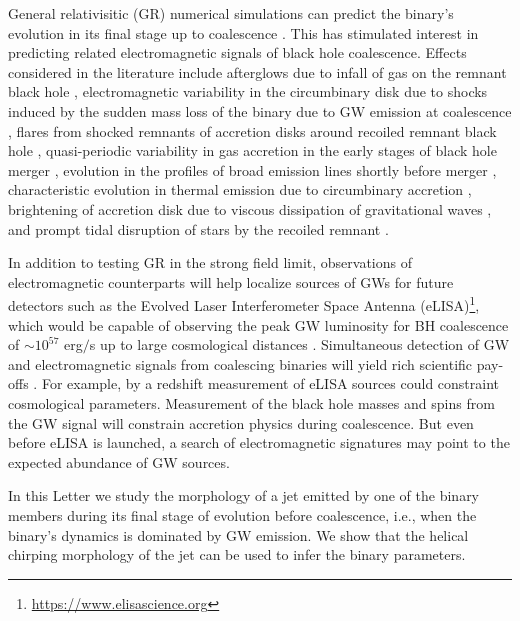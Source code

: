 \documentclass[iop]{emulateapj}
\begin{document}
General relativisitic (GR) numerical simulations can predict the
binary's evolution in its final stage up to coalescence
\citep{2005PhRvL..95l1101P, 2006PhRvL..96k1102B, 2006PhRvL..96k1101C}.
This has stimulated interest in predicting related electromagnetic
signals of black hole coalescence.  Effects considered in the
literature include afterglows due to infall of gas on the remnant
black hole \citep{2005ApJ...622L..93M}, electromagnetic variability in
the circumbinary disk due to shocks induced by the sudden mass loss of
the binary due to GW emission at coalescence
\citep{2007APS..APR.S1010B}, flares from shocked remnants of accretion
disks around recoiled remnant black hole \citep{2007PhRvL..99d1103L,
  2008ApJ...682..758S, 2009CQGra..26i4032H}, quasi-periodic
variability in gas accretion in the early stages of black hole merger
\citep{2008ApJ...672...83M, 2009CQGra..26i4032H, 2012MNRAS.427.2680K},
evolution in the profiles of broad emission lines shortly before
merger \citep{2013MNRAS.432.1468M}, characteristic evolution in
thermal emission due to circumbinary accretion
\citep{2015MNRAS.446L..36F}, brightening of accretion disk due to
viscous dissipation of gravitational waves
\citep{2008PhRvL.101d1101K}, and prompt tidal disruption of stars by
the recoiled remnant \citep{2011MNRAS.412...75S}.

In addition to testing GR in the strong field limit, observations of
electromagnetic counterparts will help localize sources of GWs for
future detectors such as the Evolved Laser Interferometer Space
Antenna (eLISA)\footnote{\url{https://www.elisascience.org}}, which would be
capable of observing the peak GW luminosity for BH coalescence of
$\sim 10^{57}$ erg$/$s up to large cosmological distances
\citep{2003CQGra..20S..65H, 2013CQGra..30x4009S}.  Simultaneous
detection of GW and electromagnetic signals from coalescing binaries
will yield rich scientific pay-offs \citep{2003CQGra..20S..65H,
  2005ApJ...629...15H}.  For example, by a redshift measurement of
eLISA sources could constraint cosmological parameters.  Measurement
of the black hole masses and spins from the GW signal will constrain
accretion physics during coalescence.  But even before eLISA is
launched, a search of electromagnetic signatures may point to the
expected abundance of GW sources.

In this Letter we study the morphology of a jet emitted by one of the
binary members during its final stage of evolution before coalescence,
i.e., when the binary's dynamics is dominated by GW emission.  We show
that the helical chirping morphology of the jet can be used to infer
the binary parameters.
\end{document}
